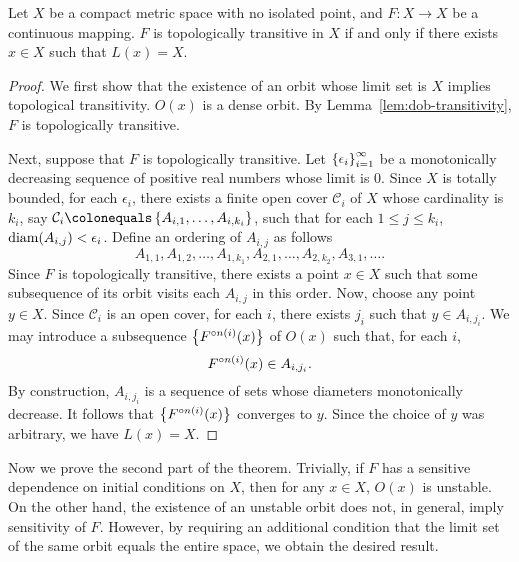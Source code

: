\documentclass[12pt,draft,twoside]{book}
\begin{document}
\begin{proposition}
  Let $X$ be a compact metric space with no isolated point, and $F: X \to X$ be a continuous mapping.
  $F$ is topologically transitive in $X$ if and only if there exists $x \in X$ such that $L(x) = X$.
  \label{prop:martelli-wiggins1}
  \begin{proof}
    We first show that the existence of an orbit whose limit set is $X$ implies topological transitivity.
    $O(x)$ is a dense orbit.
    By Lemma~\ref{lem:dob-transitivity}, $F$ is topologically transitive.

    Next, suppose that $F$ is topologically transitive.
    Let $\left \{ \epsilon_i \right \}^{\infty}_{i=1}$ be a monotonically decreasing sequence of positive real numbers whose limit is 0.
    Since $X$ is totally bounded, for each $\epsilon_i$, there exists a finite open cover $\mathcal{C}_i$ of $X$ whose cardinality is $k_i$, say $\mathcal{C}_i \ceq \set{A_{i,1}, \ldots, A_{i, k_i}}$, such that for each $1 \leq j \leq k_i$, $\mathrm{diam}(A_{i,j}) < \epsilon_i$.
    Define an ordering of $A_{i,j}$ as follows
    \begin{equation*}
      A_{1,1}, A_{1,2}, \ldots, A_{1,k_1}, A_{2,1}, \ldots, A_{2,k_2}, A_{3,1}, \ldots.
    \end{equation*}
    Since $F$ is topologically transitive, there exists a point $x \in X$ such that some subsequence of its orbit visits each $A_{i,j}$ in this order.
    Now, choose any point $y \in X$.
    Since $\mathcal{C}_i$ is an open cover, for each $i$, there exists $j_i$ such that $y \in A_{i,j_i}$.
    We may introduce a subsequence $\left \{ F^{\circ n(i)}(x) \right \}$ of $O(x)$ such that, for each $i$, 
    \begin{equation*}
      F^{\circ n(i)}(x) \in A_{i,j_i}.
    \end{equation*}
    By construction, $A_{i,j_i}$ is a sequence of sets whose diameters monotonically decrease. 
    It follows that $\left \{ F^{\circ n(i)}(x) \right \}$ converges to $y$.
    Since the choice of $y$ was arbitrary, we have $L(x) = X$.
  \end{proof}
\end{proposition}
Now we prove the second part of the theorem.
Trivially, if $F$ has a sensitive dependence on initial conditions on $X$, then for any $x \in X$, $O(x)$ is unstable.
On the other hand, the existence of an unstable orbit does not, in general, imply sensitivity of $F$.
However, by requiring an additional condition that the limit set of the same orbit equals the entire space, we obtain the desired result.
\end{document}
